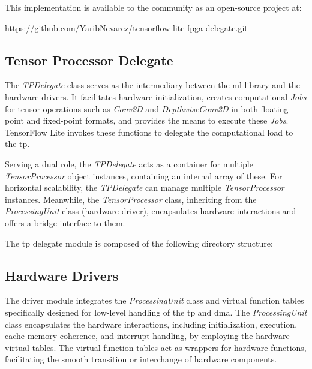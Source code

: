 This implementation is available to the community as an open-source project at:

\url{https://github.com/YaribNevarez/tensorflow-lite-fpga-delegate.git}

\FloatBarrier

\subsection {Tensor Processor Delegate}
The \textit{TPDelegate} class serves as the intermediary between the \gls{ml} library and the hardware drivers. It facilitates hardware initialization, creates computational \textit{Jobs} for tensor operations such as \textit{Conv2D} and \textit{DepthwiseConv2D} in both floating-point and fixed-point formats, and provides the means to execute these \textit{Jobs}. TensorFlow Lite invokes these functions to delegate the computational load to the \gls{tp}.

Serving a dual role, the \textit{TPDelegate} acts as a container for multiple \textit{TensorProcessor} object instances, containing an internal array of these. For horizontal scalability, the \textit{TPDelegate} can manage multiple \textit{TensorProcessor} instances. Meanwhile, the \textit{TensorProcessor} class, inheriting from the \textit{ProcessingUnit} class (hardware driver), encapsulates hardware interactions and offers a bridge interface to them.

The \gls{tp} delegate module is composed of the following directory structure:

\begin{figure}[!h]
\end{figure}
\FloatBarrier

\subsection {Hardware Drivers}
The driver module integrates the \textit{ProcessingUnit} class and virtual function tables specifically designed for low-level handling of the \gls{tp} and \gls{dma}. The \textit{ProcessingUnit} class encapsulates the hardware interactions, including initialization, execution, cache memory coherence, and interrupt handling, by employing the hardware virtual tables. The virtual function tables act as wrappers for hardware functions, facilitating the smooth transition or interchange of hardware components.

